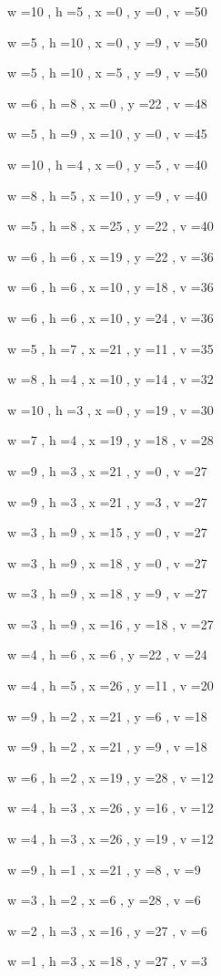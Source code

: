 \documentclass[11pt]{article}
\begin{document}
w =10 , h =5 , x =0 , y =0 , v =50
\par
w =5 , h =10 , x =0 , y =9 , v =50
\par
w =5 , h =10 , x =5 , y =9 , v =50
\par
w =6 , h =8 , x =0 , y =22 , v =48
\par
w =5 , h =9 , x =10 , y =0 , v =45
\par
w =10 , h =4 , x =0 , y =5 , v =40
\par
w =8 , h =5 , x =10 , y =9 , v =40
\par
w =5 , h =8 , x =25 , y =22 , v =40
\par
w =6 , h =6 , x =19 , y =22 , v =36
\par
w =6 , h =6 , x =10 , y =18 , v =36
\par
w =6 , h =6 , x =10 , y =24 , v =36
\par
w =5 , h =7 , x =21 , y =11 , v =35
\par
w =8 , h =4 , x =10 , y =14 , v =32
\par
w =10 , h =3 , x =0 , y =19 , v =30
\par
w =7 , h =4 , x =19 , y =18 , v =28
\par
w =9 , h =3 , x =21 , y =0 , v =27
\par
w =9 , h =3 , x =21 , y =3 , v =27
\par
w =3 , h =9 , x =15 , y =0 , v =27
\par
w =3 , h =9 , x =18 , y =0 , v =27
\par
w =3 , h =9 , x =18 , y =9 , v =27
\par
w =3 , h =9 , x =16 , y =18 , v =27
\par
w =4 , h =6 , x =6 , y =22 , v =24
\par
w =4 , h =5 , x =26 , y =11 , v =20
\par
w =9 , h =2 , x =21 , y =6 , v =18
\par
w =9 , h =2 , x =21 , y =9 , v =18
\par
w =6 , h =2 , x =19 , y =28 , v =12
\par
w =4 , h =3 , x =26 , y =16 , v =12
\par
w =4 , h =3 , x =26 , y =19 , v =12
\par
w =9 , h =1 , x =21 , y =8 , v =9
\par
w =3 , h =2 , x =6 , y =28 , v =6
\par
w =2 , h =3 , x =16 , y =27 , v =6
\par
w =1 , h =3 , x =18 , y =27 , v =3
\par
\newpage
\end{document}
